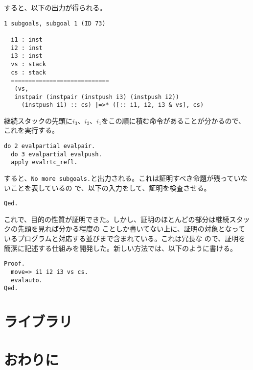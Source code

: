 \documentclass[a4paper, 10pt, twocolumn, titlepage]{ujarticle}
\renewcommand{\{}{\symbol{"7B}}
\renewcommand{\}}{\symbol{"7D}}
\begin{document}
すると、以下の出力が得られる。

\begin{lstlisting}[style=plain]
1 subgoals, subgoal 1 (ID 73)
  
  i1 : inst
  i2 : inst
  i3 : inst
  vs : stack
  cs : stack
  ============================
   (vs,
   instpair (instpair (instpush i3) (instpush i2))
     (instpush i1) :: cs) |=>* ([:: i1, i2, i3 & vs], cs)
\end{lstlisting}

継続スタックの先頭に$i_3$、$i_2$、$i_1$をこの順に積む命令があることが分かるので、これを実行する。

\begin{lstlisting}[style=plain]
  do 2 evalpartial evalpair.
  do 3 evalpartial evalpush.
  apply evalrtc_refl.
\end{lstlisting}

すると、\texttt{No more subgoals.}と出力される。これは証明すべき命題が残っていないことを表しているの
で、以下の入力をして、証明を検査させる。

\begin{lstlisting}[style=plain]
Qed.
\end{lstlisting}

これで、目的の性質が証明できた。しかし、証明のほとんどの部分は継続スタックの先頭を見れば分かる程度の
ことしか書いてない上に、証明の対象となっているプログラムと対応する並びまで含まれている。これは冗長な
ので、証明を簡潔に記述する仕組みを開発した。新しい方法では、以下のように書ける。

\begin{lstlisting}[style=plain]
Proof.
  move=> i1 i2 i3 vs cs.
  evalauto.
Qed.
\end{lstlisting}



\section{ライブラリ}



\section{おわりに}
\end{document}
